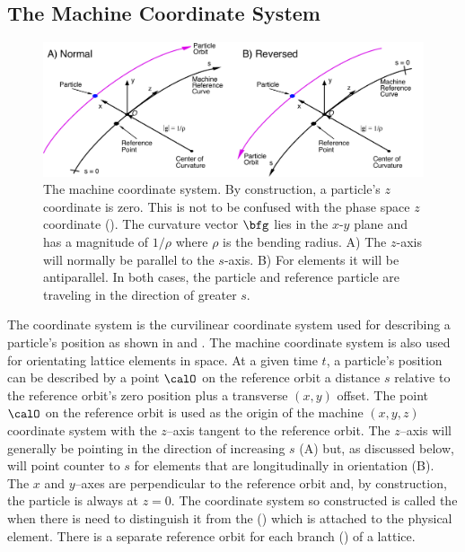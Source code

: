\subsection{The Machine Coordinate System}
\label{s:ref}

\begin{figure}[tb]
  \centering
  \includegraphics[width=6in]{machine-coords.pdf}
  \caption[Reference coordinate system.]
{The machine coordinate system. By construction, a particle's $z$ coordinate is zero.  This
is not to be confused with the phase space $z$ coordinate (). The curvature
vector $\bfg$ lies in the $x$-$y$ plane and has a magnitude of $1/\rho$ where $\rho$ is the bending
radius. A) The $z$-axis will normally be parallel to the $s$-axis. B) For  elements it
will be antiparallel. In both cases, the particle and reference particle are traveling in the
direction of greater $s$.}
  \label{f:machine.coords}
\end{figure}

The  coordinate system is the curvilinear coordinate system used for describing
a particle's position as shown in  and . 
The machine coordinate system is also used for
orientating lattice elements in space. At a given time $t$, a particle's position can be described
by a point $\calO$ on the reference orbit a distance $s$ relative to the reference orbit's zero
position plus a transverse $(x,y)$ offset. The point $\calO$ on the reference orbit is used as the
origin of the machine $(x, y, z)$ coordinate system with the $z$--axis tangent to the reference
orbit. The $z$--axis will generally be pointing in the direction of increasing $s$
(A) but, as discussed below, will point counter to $s$ for elements that are
longitudinally  in orientation (B). 
The $x$ and $y$--axes are perpendicular to the reference
orbit and, by construction, the particle is always at $z = 0$. The coordinate system so constructed
is called the  when there is need to distinguish it from the 
() which is attached to the physical element. There is a separate reference orbit
for each branch () of a lattice.

